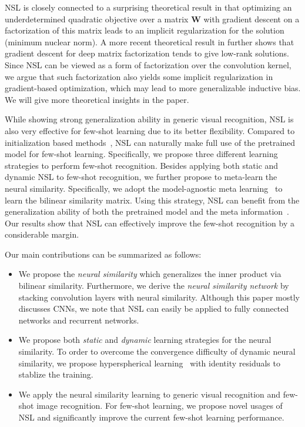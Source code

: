 \par
NSL is closely connected to a surprising theoretical result in \cite{gunasekar2017implicit} that optimizing an underdetermined quadratic objective over a matrix $\bm{W}$ with gradient descent on a factorization of this matrix leads to an implicit regularization for the solution (minimum nuclear norm). A more recent theoretical result in \cite{arora2019implicit} further shows that gradient descent for deep matrix factorization tends to give low-rank solutions. Since NSL can be viewed as a form of factorization over the convolution kernel, we argue that such factorization also yields some implicit regularization in gradient-based optimization, which may lead to more generalizable inductive bias. We will give more theoretical insights in the paper.

\par
While showing strong generalization ability in generic visual recognition, NSL is also very effective for few-shot learning due to its better flexibility. Compared to initialization based methods~\cite{finn2017model,ravi2016optimization}, NSL can naturally make full use of the pretrained model for few-shot learning. Specifically, we propose three different learning strategies to perform few-shot recognition. Besides applying both static and dynamic NSL to few-shot recognition, we further propose to meta-learn the neural similarity. Specifically, we adopt the model-agnostic meta learning~\cite{finn2017model} to learn the bilinear similarity matrix. Using this strategy, NSL can benefit from the generalization ability of both the pretrained model and the meta information~\cite{finn2017model}. Our results show that NSL can effectively improve the few-shot recognition by a considerable margin.

\par
Our main contributions can be summarized as follows:

\begin{itemize}[leftmargin=6mm,nosep,nolistsep]

    \item We propose the \emph{neural similarity} which generalizes the inner product via bilinear similarity. Furthermore, we derive the \emph{neural similarity network} by stacking convolution layers with neural similarity. Although this paper mostly discusses CNNs, we note that NSL can easily be applied to fully connected networks and recurrent networks.
    \item We propose both \emph{static} and \emph{dynamic} learning strategies for the neural similarity. To order to overcome the convergence difficulty of dynamic neural similarity, we propose hyperspherical learning~\cite{liu2017hyper} with identity residuals to stablize the training.
    \item We apply the neural similarity learning to generic visual recognition and few-shot image recognition. For few-shot learning, we propose novel usages of NSL and significantly improve the current few-shot learning performance.
\end{itemize}

